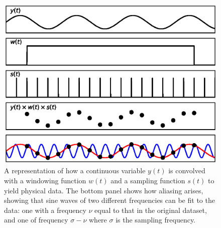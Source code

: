\begin{figure}
    \includegraphics[width=\columnwidth, trim = 0mm 10mm 0mm 10mm]{images/convolve.eps}
    \captionsetup{singlelinecheck=off}
    \caption[A representation of how a continuous variable is convolved with a windowing function and a sampling function to yield physical data.]{A representation of how a continuous variable $y(t)$ is convolved with a windowing function $w(t)$ and a sampling function $s(t)$ to yield physical data.  The bottom panel shows how aliasing arises, showing that sine waves of two different frequencies can be fit to the data: one with a frequency $\nu$ equal to that in the original dataset, and one of frequency $\sigma-\nu$ where $\sigma$ is the sampling frequency.}
   \label{fig:convolve}
\end{figure}

